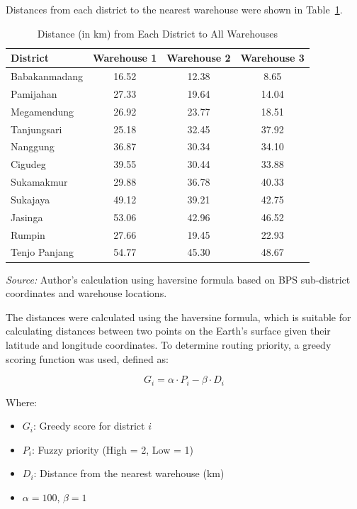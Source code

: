 \documentclass[conference,final,a4paper,twoside,10pt]{IEEEtran}
\begin{document}
Distances from each district to the nearest warehouse were shown in Table~\ref{tab:distance_matrix}.
\begin{table}[H]
\caption{Distance (in km) from Each District to All Warehouses}
\begin{center}
\begin{tabular}{|p{2cm}|c|c|c|}
\hline
\textbf{District} & \textbf{Warehouse 1} & \textbf{Warehouse 2} & \textbf{Warehouse 3} \\
\hline
Babakanmadang & 16.52 & 12.38 & 8.65 \\
\hline
Pamijahan & 27.33 & 19.64 & 14.04 \\
\hline
Megamendung & 26.92 & 23.77 & 18.51 \\
\hline
Tanjungsari & 25.18 & 32.45 & 37.92 \\
\hline
Nanggung & 36.87 & 30.34 & 34.10 \\
\hline
Cigudeg & 39.55 & 30.44 & 33.88 \\
\hline
Sukamakmur & 29.88 & 36.78 & 40.33 \\
\hline
Sukajaya & 49.12 & 39.21 & 42.75 \\
\hline
Jasinga & 53.06 & 42.96 & 46.52 \\
\hline
Rumpin & 27.66 & 19.45 & 22.93 \\
\hline
Tenjo Panjang & 54.77 & 45.30 & 48.67 \\
\hline
\end{tabular}
\vspace{0.2cm}

\footnotesize{\textit{Source:} Author’s calculation using haversine formula based on BPS sub-district coordinates and warehouse locations.}
\label{tab:distance_matrix}
\end{center}
\end{table}

The distances were calculated using the haversine formula, which is suitable for calculating distances between two points on the Earth's surface given their latitude and longitude coordinates. To determine routing priority, a greedy scoring function was used, defined as:

\begin{equation}
G_i = \alpha \cdot P_i - \beta \cdot D_i
\end{equation}

Where:
\begin{itemize}
    \item \( G_i \): Greedy score for district \( i \)
    \item \( P_i \): Fuzzy priority (High = 2, Low = 1)
    \item \( D_i \): Distance from the nearest warehouse (km)
    \item \( \alpha = 100 \), \( \beta = 1 \)
\end{itemize}
\end{document}

